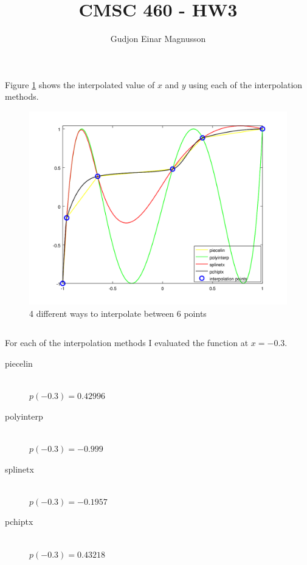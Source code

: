 \documentclass[12pt]{article}
\begin{document}
\title{CMSC 460 - HW3}
\author{Gudjon Einar Magnusson}

\maketitle

\section{} %

\subsection{}

Figure \ref{fig_interp_plot} shows the interpolated value of $x$ and $y$ using each of the interpolation methods.

\begin{figure}
    \includegraphics[width=0.6\linewidth]{interp_plot}
    \centering
    \caption{4 different ways to interpolate between 6 points}
    \label{fig_interp_plot}
\end{figure}

\subsection{}

For each of the interpolation methods I evaluated the function at $x = -0.3$.
\begin{description}
    \item[piecelin] \hfill \\
    $p(-0.3) = 0.42996$
    \item[polyinterp] \hfill \\
    $p(-0.3) = -0.999$
    \item[splinetx] \hfill \\
    $p(-0.3) = -0.1957$
    \item[pchiptx] \hfill \\
    $p(-0.3) = 0.43218$
\end{description}
\end{document}
